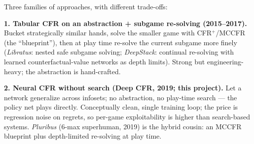 \documentclass[11pt,a4paper]{article}
\begin{document}
\begin{center}
\end{center}

Three families of approaches, with different trade-offs:

\textbf{1. Tabular CFR on an abstraction + subgame re-solving (2015--2017).}
Bucket strategically similar hands, solve the smaller game with CFR$^{+}$/MCCFR
(the ``blueprint''), then at play time re-solve the current subgame more finely
(\emph{Libratus}: nested safe subgame solving; \emph{DeepStack}: continual
re-solving with learned counterfactual-value networks as depth limits).
Strong but engineering-heavy; the abstraction is hand-crafted.

\textbf{2. Neural CFR without search (Deep CFR, 2019; this project).} Let a
network generalize across infosets; no abstraction, no play-time search ---
the policy net plays directly. Conceptually clean, single training loop;
the price is regression noise on regrets, so per-game exploitability is higher
than search-based systems. \emph{Pluribus} (6-max superhuman, 2019) is the
hybrid cousin: an MCCFR blueprint plus depth-limited re-solving at play time.
\end{document}
